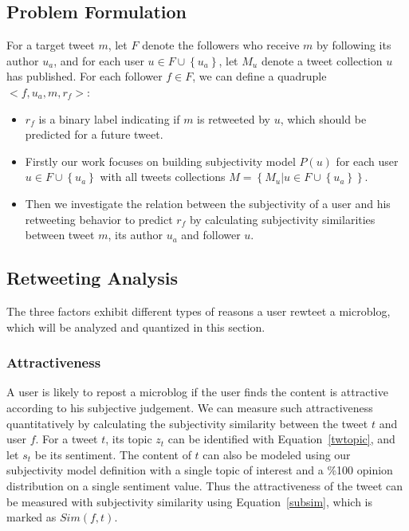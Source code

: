 \documentclass[letterpaper]{article}
\begin{document}
\subsection{Problem Formulation}
\label{formulation}

For a target tweet $ m $, let $ F $ denote the followers who receive $ m $ by following its author $ u_{a} $, and for each user $ u \in F \cup \left\lbrace u_{a} \right\rbrace  $, let $ M_{u} $ denote a tweet collection $ u $ has published. 
For each follower $ f \in F $, we can define a quadruple $ <f, u_{a}, m, r_{f}>  $: 
\begin{itemize}
\item $ r_{f} $ is a binary label indicating if $ m $ is retweeted by $ u $, which should be predicted for a future tweet.
\item Firstly our work focuses on building subjectivity model $ P\left( u \right)  $ for each user $ u \in F \cup \left\lbrace u_{a} \right\rbrace $ with all tweets collections $ M=\left\lbrace M_{u} | u \in F \cup \left\lbrace u_{a} \right\rbrace  \right\rbrace  $.
\item Then we investigate the relation between the subjectivity of a user and his retweeting behavior to predict $ r_{f} $ by calculating subjectivity similarities between tweet $ m $, its author $ u_{a} $ and follower $ u $. 
\end{itemize}

\subsection{Retweeting Analysis}
\label{analysis}

The three factors exhibit different types of reasons a user rewteet a microblog, which will be analyzed and quantized in this section.

\subsubsection{Attractiveness}

A user is likely to repost a microblog if the user finds the content is attractive according to his subjective judgement. We can measure such attractiveness quantitatively by calculating the subjectivity similarity between the tweet $ t $ and user $ f $. For a tweet $ t $, its topic $ z_t $ can be identified with Equation~\ref{twtopic}, and let $ s_t $ be its sentiment. The content of $ t $ can also be modeled using our subjectivity model definition with a single topic of interest and a \%100 opinion distribution on a single sentiment value. Thus the attractiveness of the tweet can be measured with subjectivity similarity using Equation~\ref{subsim}, which is marked as $ Sim(f,t) $.
\end{document}
